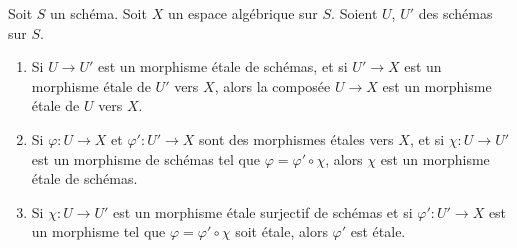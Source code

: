\begin{lemma}
\label{lemma-etale-over-space}
Soit $S$ un schéma.
Soit $X$ un espace algébrique sur $S$.
Soient $U$, $U'$ des schémas sur $S$.
\begin{enumerate}
\item Si $U \to U'$ est un morphisme \'etale de schémas, et
si $U' \to X$ est un morphisme \'etale de $U'$ vers $X$, alors la
composée $U \to X$ est un morphisme \'etale de $U$ vers $X$.
\item Si $\varphi : U \to X$ et $\varphi' : U' \to X$ sont des
morphismes \'etales vers $X$, et si $\chi : U \to U'$ est un
morphisme de schémas tel que $\varphi = \varphi' \circ \chi$,
alors $\chi$ est un morphisme \'etale de schémas.
\item Si $\chi : U \to U'$ est un morphisme \'etale surjectif
de schémas et si $\varphi' : U' \to X$ est un morphisme tel que
$\varphi = \varphi' \circ \chi$ soit \'etale, alors $\varphi'$
est \'etale.
\end{enumerate}
\end{lemma}


